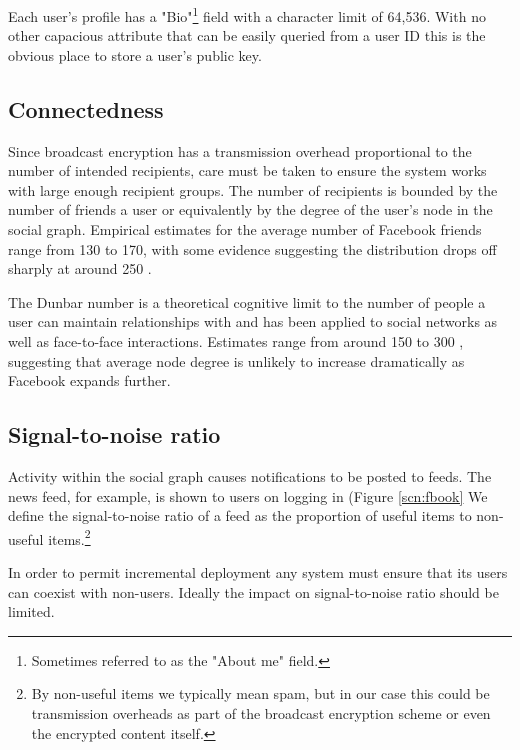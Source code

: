 Each user's profile has a "Bio"\footnote{Sometimes referred to as the "About me" field.} field with a character limit of 64,536. With no other capacious attribute that can be easily queried from a user ID this is the obvious place to store a user's public key.

    
\subsection{Connectedness}
\label{sec:cness}

Since broadcast encryption has a transmission overhead proportional to the number of intended recipients, care must be taken to ensure the system works with large enough recipient groups. The number of recipients is bounded by the number of friends a user or equivalently by the degree of the user's node in the social graph. Empirical estimates for the average number of Facebook friends range from 130 to 170, with some evidence suggesting the distribution drops off sharply at around 250 \cite{fb-factsheet} \cite{fb-connectedness}.

The Dunbar number is a theoretical cognitive limit to the number of people a user can maintain relationships with and has been applied to social networks as well as face-to-face interactions. Estimates range from around 150 to 300 \cite{dunbar} \cite{socnetsize}, suggesting that average node degree is unlikely to increase dramatically as Facebook expands further.


\subsection{Signal-to-noise ratio}
\label{sec:signoise}

Activity within the social graph causes notifications to be posted to feeds. The news feed, for example, is shown to users on logging in (Figure \ref{scn:fbook}  We define the signal-to-noise ratio of a feed as the proportion of useful items to non-useful items.\footnote{By non-useful items we typically mean spam, but in our case this could be transmission overheads as part of the broadcast encryption scheme or even the encrypted content itself.}

In order to permit incremental deployment any system must ensure that its users can coexist with non-users. Ideally the impact on signal-to-noise ratio should be limited.

